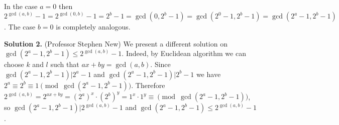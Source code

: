 \documentclass[11pt]{article}
\begin{document}
\begin{enumerate}
In the case $a=0$ then $2^{\gcd (a,b)}-1=2^{\gcd (0,b)}-1=2^b-1=\gcd (0, 2^b-1)=\gcd (2^0-1, 2^b-1)=\gcd (2^a-1, 2^b-1)$. The case $b=0$ is completely analogous.

\textbf {Solution 2.} (Professor Stephen New) We present a different solution on $\gcd (2^a-1, 2^b-1)\le 2^{\gcd (a,b)}-1$. Indeed, by Euclidean algorithm we can choose $k$ and $l$ such that $ax+by=\gcd (a,b)$. Since $\gcd (2^a-1, 2^b-1)|2^a-1$ and $\gcd (2^a-1, 2^b-1)|2^b-1$ we have $2^a\equiv 2^b\equiv 1\pmod {\gcd (2^a-1, 2^b-1)}$. Therefore $2^{\gcd (a,b)}=2^{ax+by}=(2^a)^x\cdot (2^b)^y=1^x\cdot 1^y\equiv\pmod {\gcd (2^a-1, 2^b-1)}$, so $\gcd (2^a-1, 2^b-1)|2^{\gcd (a,b)}-1$ and $\gcd (2^a-1, 2^b-1)\le 2^{\gcd (a,b)}-1$.

\end{enumerate}
\end{document}
